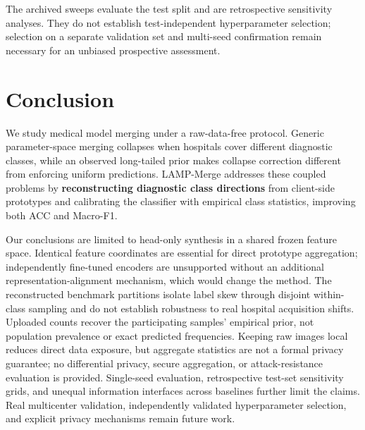 \documentclass[journal,twoside,web]{ieeecolor}
\begin{document}
The archived sweeps evaluate the test split and are retrospective sensitivity analyses. They do not establish test-independent hyperparameter selection; selection on a separate validation set and multi-seed confirmation remain necessary for an unbiased prospective assessment.


\section{Conclusion}

We study medical model merging under a raw-data-free protocol. Generic parameter-space merging collapses when hospitals cover different diagnostic classes, while an observed long-tailed prior makes collapse correction different from enforcing uniform predictions. LAMP-Merge addresses these coupled problems by \textbf{reconstructing diagnostic class directions} from client-side prototypes and calibrating the classifier with empirical class statistics, improving both ACC and Macro-F1.

Our conclusions are limited to head-only synthesis in a shared frozen feature space. Identical feature coordinates are essential for direct prototype aggregation; independently fine-tuned encoders are unsupported without an additional representation-alignment mechanism, which would change the method. The reconstructed benchmark partitions isolate label skew through disjoint within-class sampling and do not establish robustness to real hospital acquisition shifts. Uploaded counts recover the participating samples' empirical prior, not population prevalence or exact predicted frequencies. Keeping raw images local reduces direct data exposure, but aggregate statistics are not a formal privacy guarantee; no differential privacy, secure aggregation, or attack-resistance evaluation is provided. Single-seed evaluation, retrospective test-set sensitivity grids, and unequal information interfaces across baselines further limit the claims. Real multicenter validation, independently validated hyperparameter selection, and explicit privacy mechanisms remain future work.




% 
\end{document}
